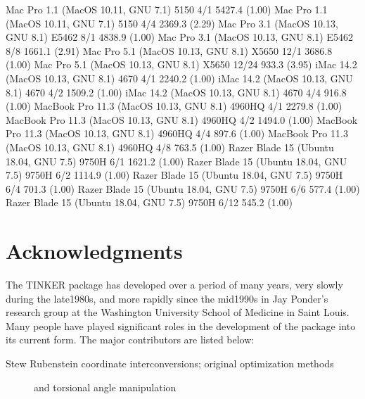 \documentclass[letterpaper,11pt,english]{sphinxmanual}
\begin{document}

\begin{sphinxVerbatim}[commandchars=\\\{\}]
Mac Pro 1.1 (MacOS 10.11, GNU 7.1)             5150           4/1      5427.4 (1.00)
Mac Pro 1.1 (MacOS 10.11, GNU 7.1)             5150           4/4      2369.3 (2.29)
Mac Pro 3.1 (MacOS 10.13, GNU 8.1)            E5462           8/1      4838.9 (1.00)
Mac Pro 3.1 (MacOS 10.13, GNU 8.1)            E5462           8/8      1661.1 (2.91)
Mac Pro 5.1 (MacOS 10.13, GNU 8.1)            X5650          12/1      3686.8 (1.00)
Mac Pro 5.1 (MacOS 10.13, GNU 8.1)            X5650         12/24       933.3 (3.95)
iMac 14.2 (MacOS 10.13, GNU 8.1)               4670           4/1      2240.2 (1.00)
iMac 14.2 (MacOS 10.13, GNU 8.1)               4670           4/2      1509.2 (1.00)
iMac 14.2 (MacOS 10.13, GNU 8.1)               4670           4/4       916.8 (1.00)
MacBook Pro 11.3 (MacOS 10.13, GNU 8.1)      4960HQ           4/1      2279.8 (1.00)
MacBook Pro 11.3 (MacOS 10.13, GNU 8.1)      4960HQ           4/2      1494.0 (1.00)
MacBook Pro 11.3 (MacOS 10.13, GNU 8.1)      4960HQ           4/4       897.6 (1.00)
MacBook Pro 11.3 (MacOS 10.13, GNU 8.1)      4960HQ           4/8       763.5 (1.00)
Razer Blade 15 (Ubuntu 18.04, GNU 7.5)        9750H           6/1      1621.2 (1.00)
Razer Blade 15 (Ubuntu 18.04, GNU 7.5)        9750H           6/2      1114.9 (1.00)
Razer Blade 15 (Ubuntu 18.04, GNU 7.5)        9750H           6/4       701.3 (1.00)
Razer Blade 15 (Ubuntu 18.04, GNU 7.5)        9750H           6/6       577.4 (1.00)
Razer Blade 15 (Ubuntu 18.04, GNU 7.5)        9750H          6/12       545.2 (1.00)
\end{sphinxVerbatim}


\chapter{Acknowledgments}
\label{\detokenize{text/acknowledgements:acknowledgments}}\label{\detokenize{text/acknowledgements::doc}}
The TINKER package has developed over a period of many years, very slowly during the late\sphinxhyphen{}1980s, and more rapidly since the mid\sphinxhyphen{}1990s in Jay Ponder’s research group at the Washington University School of Medicine in Saint Louis. Many people have played significant roles in the development of the package into its current form. The major contributors are listed below:
\begin{description}
\item[{Stew Rubenstein coordinate interconversions; original optimization methods}] \leavevmode
and torsional angle manipulation

\end{description}
\end{document}
